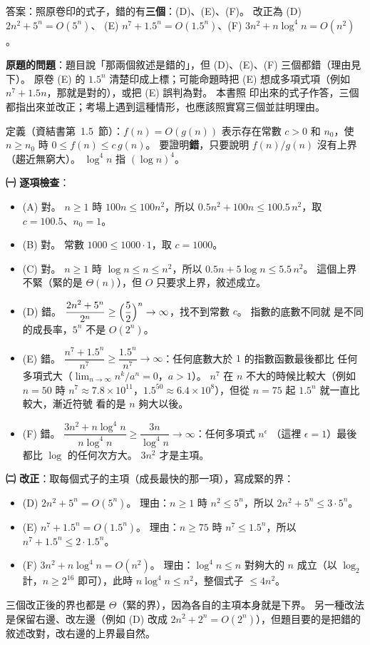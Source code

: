 \begin{pastsoln}
答案：照原卷印的式子，錯的有\textbf{三個}：(D)、(E)、(F)。 改正為 (D) $2n^2 + 5^n = O(5^n)$、
(E) $n^7 + 1.5^n = O(1.5^n)$、(F) $3n^2 + n \log^4 n = O(n^2)$。

\textbf{原題的問題}：題目說「那兩個敘述是錯的」，但 (D)、(E)、(F) 三個都錯（理由見下）。 原卷 (E) 的 $1.5^n$
清楚印成上標；可能命題時把 (E) 想成多項式項（例如 $n^7 + 1.5n$，那就是對的），或把 (E) 誤判為對。 本書照
印出來的式子作答，三個都指出來並改正；考場上遇到這種情形，也應該照實寫三個並註明理由。

定義（資結書第~1.5~節）：$f(n) = O(g(n))$ 表示存在常數 $c > 0$ 和 $n_0$，使 $n \ge n_0$ 時
$0 \le f(n) \le c\,g(n)$。 要證明\textbf{錯}，只要說明 $f(n)/g(n)$ 沒有上界（趨近無窮大）。 $\log^4 n$ 指
$(\log n)^4$。

\textbf{㈠ 逐項檢查}：
\begin{itemize}
\item (A) 對。 $n \ge 1$ 時 $100n \le 100n^2$，所以 $0.5n^2 + 100n \le 100.5\,n^2$，取 $c = 100.5$、$n_0 = 1$。
\item (B) 對。 常數 $1000 \le 1000 \cdot 1$，取 $c = 1000$。
\item (C) 對。 $n \ge 1$ 時 $\log n \le n \le n^2$，所以 $0.5n + 5\log n \le 5.5\,n^2$。 這個上界不緊（緊的是
$\Theta(n)$），但 $O$ 只要求上界，敘述成立。
\item (D) 錯。 $\dfrac{2n^2 + 5^n}{2^n} \ge \Bigl(\dfrac{5}{2}\Bigr)^n \to \infty$，找不到常數 $c$。 指數的底數不同就
是不同的成長率，$5^n$ 不是 $O(2^n)$。
\item (E) 錯。 $\dfrac{n^7 + 1.5^n}{n^7} \ge \dfrac{1.5^n}{n^7} \to \infty$：任何底數大於 $1$ 的指數函數最後都比
任何多項式大（$\lim_{n\to\infty} n^k / a^n = 0$，$a > 1$）。 $n^7$ 在 $n$ 不大的時候比較大（例如 $n = 50$ 時
$n^7 \approx 7.8 \times 10^{11}$，$1.5^{50} \approx 6.4 \times 10^{8}$），但從 $n = 75$ 起 $1.5^n$ 就一直比較大，漸近符號
看的是 $n$ 夠大以後。
\item (F) 錯。 $\dfrac{3n^2 + n\log^4 n}{n \log^4 n} \ge \dfrac{3n}{\log^4 n} \to \infty$：任何多項式 $n^{\epsilon}$
（這裡 $\epsilon = 1$）最後都比 $\log$ 的任何次方大。 $3n^2$ 才是主項。
\end{itemize}

\textbf{㈡ 改正}：取每個式子的主項（成長最快的那一項），寫成緊的界：
\begin{itemize}
\item (D) $2n^2 + 5^n = O(5^n)$。 理由：$n \ge 1$ 時 $n^2 \le 5^n$，所以 $2n^2 + 5^n \le 3 \cdot 5^n$。
\item (E) $n^7 + 1.5^n = O(1.5^n)$。 理由：$n \ge 75$ 時 $n^7 \le 1.5^n$，所以
$n^7 + 1.5^n \le 2 \cdot 1.5^n$。
\item (F) $3n^2 + n \log^4 n = O(n^2)$。 理由：$\log^4 n \le n$ 對夠大的 $n$ 成立（以 $\log_2$ 計，$n \ge 2^{16}$
即可），此時 $n \log^4 n \le n^2$，整個式子 $\le 4n^2$。
\end{itemize}
三個改正後的界也都是 $\Theta$（緊的界），因為各自的主項本身就是下界。 另一種改法是保留右邊、改左邊（例如
(D) 改成 $2n^2 + 2^n = O(2^n)$），但題目要的是把錯的敘述改對，改右邊的上界最自然。
\end{pastsoln}
